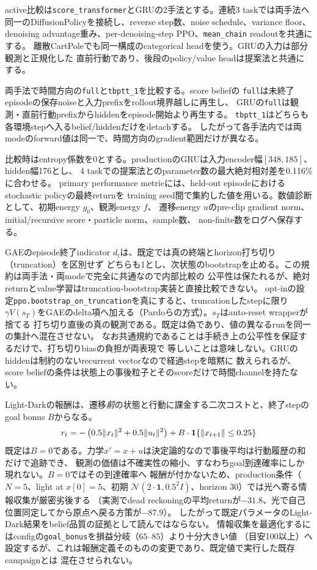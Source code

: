 \documentclass{article}
\begin{document}
active比較は\texttt{score\_transformer}とGRUの2手法とする。連続3 taskでは両手法へ
同一のDiffusionPolicyを接続し、reverse step数、noise schedule、variance floor、
denoising advantage重み、per-denoising-step PPO、\texttt{mean\_chain} readoutを共通にする。
離散CartPoleでも同一構成のcategorical headを使う。GRUの入力は部分観測と正規化した
直前行動であり、後段のpolicy/value headは提案法と共通にする。

両手法で時間方向の\texttt{full}と\texttt{tbptt\_1}を比較する。score beliefの
\texttt{full}は未終了episodeの保存noiseと入力prefixをrollout境界越しに再生し、
GRUの\texttt{full}は観測・直前行動prefixからhiddenをepisode開始より再生する。
\texttt{tbptt\_1}はどちらも各環境stepへ入るbelief/hiddenだけをdetachする。
したがって各手法内では両modeのforward値は同一で、時間方向のgradient範囲だけが異なる。

比較時はentropy係数を0とする。productionのGRUは入力encoder幅$[348,185]$、hidden幅176とし、
4 taskでの提案法とのparameter数の最大絶対相対差を0.116\%に合わせる。
primary performance metricには、held-out episodeにおけるstochastic policyの最終returnを
training seed間で集約した値を用いる。数値診断として、初期energy $g_0$、観測energy $f$、
遷移energy $u$のpre-clip gradient norm、initial/recursive score・particle norm、sample数、
non-finite数をログへ保存する。

GAEのepisode終了indicator $d_t$は、既定では真の終端とhorizon打ち切り（truncation）を区別せず
どちらも1とし、次状態のbootstrapを止める。この規約は両手法・両modeで完全に共通なので内部比較の
公平性は保たれるが、絶対returnとvalue学習はtruncation-bootstrap実装と直接比較できない。
opt-inの設定\texttt{ppo.bootstrap\_on\_truncation}を真にすると、truncationしたstepに限り
$\gamma V(s_T)$をGAEのdelta項へ加える（Pardoらの方式）。$s_T$はauto-reset wrapperが捨てる
打ち切り直後の真の観測である。既定は偽であり、値の異なるrunを同一の集計へ混在させない。
なお共通規約であることは手続き上の公平性を保証するだけで、打ち切りbiasの負担が両表現で
等しいことは意味しない。GRUのhiddenは制約のないrecurrent vectorなので経過stepを暗黙に
数えられるが、score beliefの条件は状態上の事後粒子とそのscoreだけで時間channelを持たない。

Light-Darkの報酬は、遷移\emph{前}の状態と行動に課金する二次コストと、終了stepのgoal bonus
$B$からなる。
\[
    r_t = -\pr[0.5 \lVert x_t \rVert^2 + 0.5 \lVert u_t \rVert^2]
        + B \cdot \mathbf{1}\{\lVert x_{t+1} \rVert \le 0.25\}
\]
既定は$B=0$である。力学$x' = x + u$は決定論的なので事後平均は行動履歴の和だけで追跡でき、
観測の価値は不確実性の縮小、すなわちgoal到達確率にしか現れない。$B=0$ではその到達確率へ
報酬が付かないため、production条件（$N=5$、light at $x[0]=5$、初期
$\mathcal{N}(2 \cdot \mathbf{1}, 0.5^2 I)$、horizon 30）では光へ寄る情報収集が厳密劣後する
（実測でdead reckoningの平均returnが$-31.8$、光で自己位置同定してから原点へ戻る方策が$-87.9$）。
したがって既定パラメータのLight-Dark結果をbelief品質の証拠として読んではならない。
情報収集を最適化するにはconfigの\texttt{goal\_bonus}を損益分岐（$65$--$85$）より十分大きい値
（目安100以上）へ設定するが、これは報酬定義そのものの変更であり、既定値で実行した既存campaignとは
混在させられない。
\end{document}
